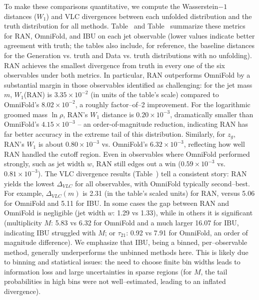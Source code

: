             To make these comparisons quantitative, we compute the Wasserstein\(-1\) distances ($W_1$) and VLC divergences between each unfolded distribution and the truth distribution for all methods.
            Table~ and Table~ summarize these metrics for RAN, OmniFold, and IBU on each jet observable (lower values indicate better agreement with truth; the tables also include, for reference, the baseline distances for the Generation vs. truth and Data vs. truth distributions with no unfolding).
            RAN achieves the smallest divergence from truth in every one of the six observables under both metrics.
            In particular, RAN outperforms OmniFold by a substantial margin in those observables identified as challenging: for the jet mass $m$, $W_1$(RAN) is $3.35\times10^{-2}$ (in units of the table’s scale) compared to OmniFold’s $8.02\times10^{-2}$, a roughly factor--of--2 improvement.
            For the logarithmic groomed mass $\ln\rho$, RAN’s $W_1$ distance is $0.20\times10^{-3}$, dramatically smaller than OmniFold’s $4.15\times10^{-3}$ – an order-of-magnitude reduction, indicating RAN has far better accuracy in the extreme tail of this distribution.
            Similarly, for $z_g$, RAN’s $W_1$ is about $0.80\times10^{-3}$ vs. OmniFold’s $6.32\times10^{-3}$, reflecting how well RAN handled the cutoff region.
            Even in observables where OmniFold performed strongly, such as jet width $w$, RAN still edges out a win ($0.59\times10^{-3}$ vs. $0.81\times10^{-3}$).
            The VLC divergence results (Table~) tell a consistent story: RAN yields the lowest $\Delta_{VLC}$ for all observables, with OmniFold typically second--best.
            For example, $\Delta_{VLC}(m)$ is 2.31 (in the table’s scaled units) for RAN, versus 5.06 for OmniFold and 5.11 for IBU.
            In some cases the gap between RAN and OmniFold is negligible (jet width $w$: 1.29 vs 1.33), while in others it is significant (multiplicity $M$: 5.83 vs 6.32 for OmniFold and a much larger 16.07 for IBU, indicating IBU struggled with $M$; or $\tau_{21}$: 0.92 vs 7.91 for OmniFold, an order of magnitude difference).
            We emphasize that IBU, being a binned, per--observable method, generally underperforms the unbinned methods here.
            This is likely due to binning and statistical issues: the need to choose finite bin widths leads to information loss and large uncertainties in sparse regions (for $M$, the tail probabilities in high bins were not well--estimated, leading to an inflated divergence).
